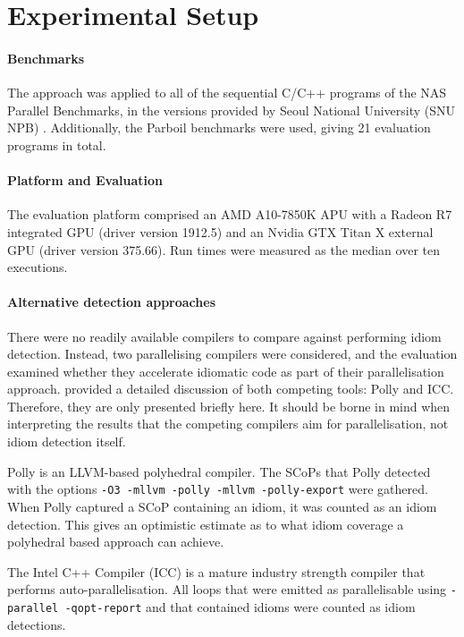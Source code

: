 \section{Experimental Setup}

    \paragraph*{Benchmarks}
    The approach was applied to all of the sequential C/C++ programs of the NAS
    Parallel Benchmarks, in the versions provided by Seoul National University
    (SNU NPB) \citep{seo2011performance}.
    Additionally, the Parboil benchmarks \citep{Stratton2018} were used,
    giving 21 evaluation programs in total. 

    \paragraph*{Platform and Evaluation}
    The evaluation platform comprised an AMD A10-7850K APU with a Radeon R7
    integrated GPU (driver version 1912.5) and an Nvidia GTX Titan X external
    GPU (driver version 375.66).
    Run times were measured as the median over ten executions.

    \paragraph*{Alternative detection approaches}
    There were no readily available compilers to compare against performing idiom
    detection.
    Instead, two parallelising compilers were considered, and the evaluation
    examined whether they accelerate idiomatic code as part of their
    parallelisation approach.
     provided a detailed discussion of both
    competing tools: Polly and ICC.
    Therefore, they are only presented briefly here.
    It should be borne in mind when interpreting the results that the
    competing compilers aim for parallelisation, not idiom detection itself.

    Polly is an LLVM-based polyhedral compiler.
    The SCoPs that Polly detected with the options
    \texttt{-O3 -mllvm -polly -mllvm -polly-export} were gathered.
    When Polly captured a SCoP containing an idiom, it was counted as an
    idiom detection.
    This gives an optimistic estimate as to what idiom coverage a polyhedral
    based approach can achieve.

    The Intel C++ Compiler (ICC) is a mature industry strength compiler that
    performs auto-parallelisation.
    All loops that were emitted as parallelisable using
    \texttt{-parallel -qopt-report} and that contained idioms were counted as
    idiom detections.

